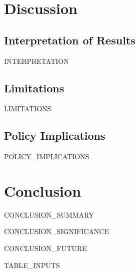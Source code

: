 

\section{Discussion}
\label{sec:discussion}

\subsection{Interpretation of Results}
{{INTERPRETATION}}

\subsection{Limitations}
{{LIMITATIONS}}

\subsection{Policy Implications}
{{POLICY_IMPLICATIONS}}


\section{Conclusion}
\label{sec:conclusion}

{{CONCLUSION_SUMMARY}}

{{CONCLUSION_SIGNIFICANCE}}

{{CONCLUSION_FUTURE}}


\clearpage
{{TABLE_INPUTS}}
% 
% 


